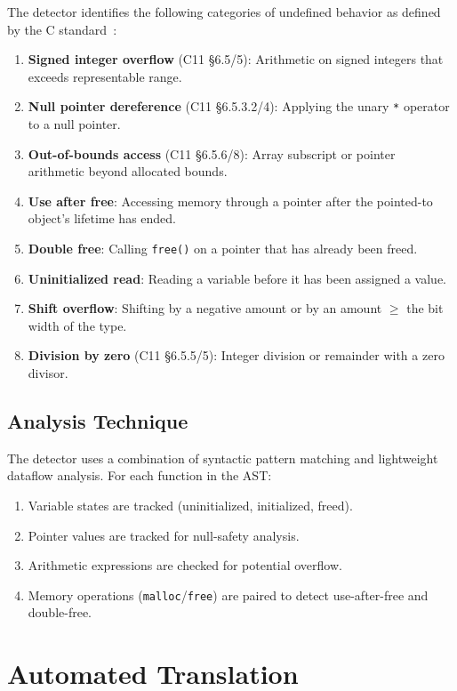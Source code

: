 \documentclass[11pt,a4paper]{article}
\begin{document}
The detector identifies the following categories of undefined behavior
as defined by the C standard~\cite{iso9899}:

\begin{enumerate}
  \item \textbf{Signed integer overflow} (C11 \S6.5/5): Arithmetic on
    signed integers that exceeds representable range.
  \item \textbf{Null pointer dereference} (C11 \S6.5.3.2/4): Applying
    the unary \texttt{*} operator to a null pointer.
  \item \textbf{Out-of-bounds access} (C11 \S6.5.6/8): Array subscript
    or pointer arithmetic beyond allocated bounds.
  \item \textbf{Use after free}: Accessing memory through a pointer
    after the pointed-to object's lifetime has ended.
  \item \textbf{Double free}: Calling \texttt{free()} on a pointer
    that has already been freed.
  \item \textbf{Uninitialized read}: Reading a variable before it has
    been assigned a value.
  \item \textbf{Shift overflow}: Shifting by a negative amount or by
    an amount $\geq$ the bit width of the type.
  \item \textbf{Division by zero} (C11 \S6.5.5/5): Integer division
    or remainder with a zero divisor.
\end{enumerate}

\subsection{Analysis Technique}

The detector uses a combination of syntactic pattern matching and
lightweight dataflow analysis. For each function in the AST:
\begin{enumerate}
  \item Variable states are tracked (uninitialized, initialized, freed).
  \item Pointer values are tracked for null-safety analysis.
  \item Arithmetic expressions are checked for potential overflow.
  \item Memory operations (\texttt{malloc}/\texttt{free}) are paired
    to detect use-after-free and double-free.
\end{enumerate}


\section{Automated Translation}\label{sec:translation}
\end{document}
